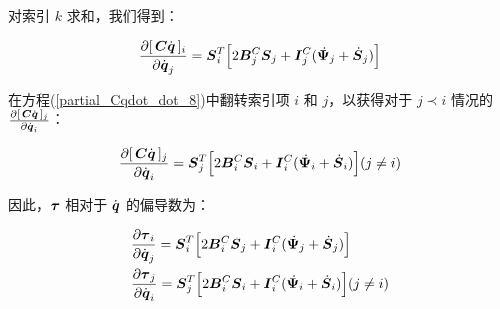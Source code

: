 \documentclass[letterpaper, 10 pt, conference]{ieeetran}  %
\begin{document}
{\begin{enumerate}
对索引 $k$ 求和，我们得到：

  \begin{equation}
      \begin{aligned}
        \frac{\partial  [\,\C \qd\,]_{i}}{\partial \qd_{j}} =   \Phibar_{i}^{T} \Big[2 \B_{j}^{C} \Phibar_{j} +  \I_{j}^{C} (    \Psibardot_{j} + \Phibardot_{j} ) \Big]  
        \label{partial_Cqdot_dot_8}
      \end{aligned}
\end{equation}
\end{enumerate}

在方程(\ref{partial_Cqdot_dot_8})中翻转索引项 $i$ 和 $j$，以获得对于 $j \prec i$ 情况的 $\frac{\partial  [\,\boldsymbol{C} \dot{\boldsymbol{q}}\,]_{j}}{\partial \dot{\boldsymbol{q}}_{i}} $：
  
  \begin{equation}
      \begin{aligned}
        \frac{\partial  [\,\C \qd\,]_{j}}{\partial \qd_{i}} =   \Phibar_{j}^{T} \Big[2 \B_{i}^{C} \Phibar_{i} +  \I_{i}^{C} (    \Psibardot_{i} + \Phibardot_{i} ) \Big]  (j \neq i)
        \label{partial_Cqdot_dot_9}
      \end{aligned}
\end{equation}

因此，$\boldsymbol{\tau}$ 相对于 $\dot{\boldsymbol{q}}$ 的偏导数为：

  \begin{equation}
      \begin{aligned}
      &  \frac{\partial  \taubar_{i}}{\partial \qd_{j}} =   \Phibar_{i}^{T} \Big[2 \B_{i}^{C} \Phibar_{j} +  \I_{i}^{C} (    \Psibardot_{j} + \Phibardot_{j} ) \Big]  \\
      &   \frac{\partial  \taubar_{j}}{\partial \qd_{i}} =   \Phibar_{j}^{T} \Big[2 \B_{i}^{C} \Phibar_{i} +  \I_{i}^{C} (    \Psibardot_{i} + \Phibardot_{i} ) \Big]  (j \neq i)
        \label{tau_FO_qd_eqn1}
      \end{aligned}
\end{equation}

}
\end{document}
